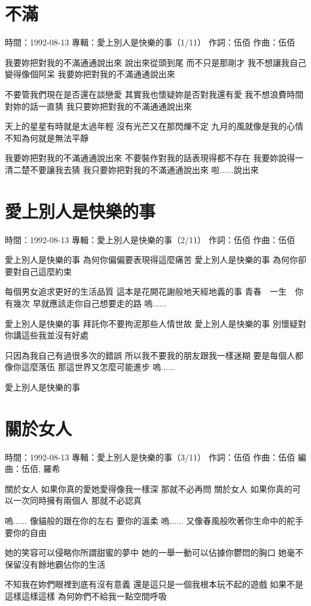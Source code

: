\documentclass[UTF8,a4paper,oneside,twocolumn,12pt]{ctexbook}
\newcommand{\infopair}[2]{\textbullet #1：#2}
\newcommand{\zc}[1][伍佰]{\infopair{作詞}{#1}}
\newcommand{\zq}[1][伍佰]{\infopair{作曲}{#1}}
\newcommand{\bq}[1][伍佰]{\infopair{編曲}{#1}}
\newcommand{\zj}[1]{\infopair{專輯}{#1}}
\newcommand{\sj}[1]{\infopair{時間}{#1}}
\newenvironment{info}{\begin{flushleft}\kaishu
	}
	{\end{flushleft}\normalsize\yahei\par}
\newenvironment{lyric}{
	}
{}
\begin{document}
\section{不滿}
\begin{info}
	\sj{1992-08-13}
	\zj{愛上別人是快樂的事（1/11）}
	\zc
	\zq
\end{info}
\begin{lyric}
	我要妳把對我的不滿通通說出來
	說出來從頭到尾 而不只是那剛才
	我不想讓我自己變得像個阿呆
	我要妳把對我的不滿通通說出來

	不要管我們現在是否還在談戀愛
	其實我也懷疑妳是否對我還有愛
	我不想浪費時間對妳的話一直猜
	我只要妳把對我的不滿通通說出來

	天上的星星有時就是太過年輕
	沒有光芒又在那閃爍不定
	九月的風就像是我的心情
	不知為何就是無法平靜

	我要妳把對我的不滿通通說出來
	不要裝作對我的話表現得都不存在
	我要妳說得一清二楚不要讓我去猜
	我只要妳把對我的不滿通通說出來
	啦......說出來
\end{lyric}

\section{愛上別人是快樂的事}
\begin{info}
	\sj{1992-08-13}
	\zj{愛上別人是快樂的事（2/11）}
	\zc
	\zq
\end{info}
\begin{lyric}
	愛上別人是快樂的事
	為何你偏偏要表現得這麼痛苦
	愛上別人是快樂的事
	為何你卻要對自己這麼約束

	每個男女追求更好的生活品質
	這本是花開花謝般地天經地義的事
	青春　一生　你有幾次
	早就應該走你自己想要走的路
	嗚......

	愛上別人是快樂的事
	拜託你不要拘泥那些人情世故
	愛上別人是快樂的事
	別懷疑對你講這些我並沒有好處

	只因為我自己有過很多次的錯誤
	所以我不要我的朋友跟我一樣迷糊
	要是每個人都像你這麼落伍
	那這世界又怎麼可能進步
	嗚......

	愛上別人是快樂的事
\end{lyric}

\section{關於女人}
\begin{info}
	\sj{1992-08-13}
	\zj{愛上別人是快樂的事（3/11）}
	\zc
	\zq
	\bq[伍佰, 羅希]
\end{info}
\begin{lyric}
	關於女人
	如果你真的愛她愛得像我一樣深
	那就不必再問
	關於女人
	如果你真的可以一次同時擁有兩個人
	那就不必認真

	嗚......
	像貓般的跟在你的左右
	要你的溫柔
	嗚......
	又像春風般吹著你生命中的舵手
	要你的自由

	她的笑容可以侵略你所謂甜蜜的夢中
	她的一舉一動可以佔據你鬱悶的胸口
	她毫不保留沒有餘地霸佔你的生活

	不知我在妳們眼裡到底有沒有意義
	還是這只是一個我根本玩不起的遊戲
	如果不是這樣這樣這樣 為何妳們不給我一點空間呼吸
\end{lyric}
\end{document}
